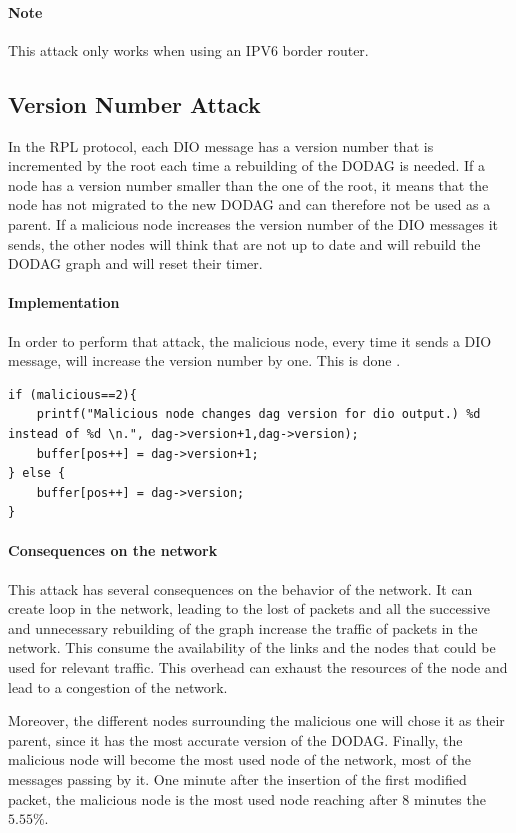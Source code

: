 \documentclass[11pt]{report}
\begin{document}
\paragraph{Note} This attack only works when using an IPV6 border router.


\subsection{Version Number Attack}
In the \textsc{RPL} protocol, each \textsc{DIO} message has a version number that is
incremented by the root each time a rebuilding of the \textsc{DODAG} is needed.
If a node has a version number smaller than the one of the root, it
means that the node has not migrated to the new \textsc{DODAG} and can therefore
not be used as a parent. If a malicious node increases the version
number of the \textsc{DIO} messages it sends, the other nodes will think that are
not up to date and will rebuild the \textsc{DODAG} graph and will reset their
timer.

\paragraph{Implementation}
In order to perform that attack, the malicious node, every time it sends
a \textsc{DIO} message, will increase the version number by one. This is done .

\begin{lstlisting}[caption={Version number attack done in
the rpl-icmp6.c file in the method dis\_output}]
if (malicious==2){
    printf("Malicious node changes dag version for dio output.) %d instead of %d \n.", dag->version+1,dag->version);
	buffer[pos++] = dag->version+1;
} else {
	buffer[pos++] = dag->version;
}
\end{lstlisting}

\paragraph{Consequences on the network}
This attack has several consequences on the behavior of the network. It
can create loop in the network, leading to the lost of packets and all
the successive and unnecessary rebuilding of the graph increase the
traffic of packets in the network. This consume the availability of the
links and the nodes that could be used for relevant traffic. This
overhead can exhaust the resources of the node and lead to a congestion
of the network. 


Moreover, the different nodes surrounding the malicious one will chose
it as their parent, since it has the most accurate version of the \textsc{DODAG}.
Finally, the malicious node will become the most used node of the
network, most of the messages passing by it. One minute after the
insertion of the first modified packet, the malicious node is the most
used node reaching after $8$ minutes the $5.55\%$. 
\end{document}
